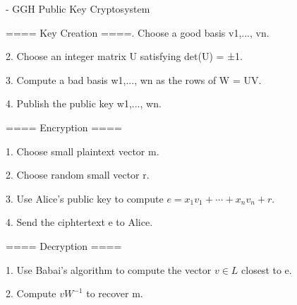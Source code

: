 \documentclass{article}
\begin{document}
- GGH Public Key Cryptosystem\newline
	
==== Key Creation ====\newline{}. Choose a good basis v1,..., vn.\par
2. Choose an integer matrix U satisfying det(U) = ±1.\par
3. Compute a bad basis w1,..., wn as the rows of W = UV.\par 
4. Publish the public key w1,..., wn.\par

\par
	==== Encryption ====\par 
1. Choose small plaintext vector m.\par
2. Choose random small vector r.\par 
3. Use Alice’s public key to compute $e = x_1v_1 + \text{···} + x_nv_n + r.$\par
4. Send the ciphtertext e to Alice.\par 
\par

	==== Decryption ====\par
1. Use Babai’s algorithm to compute the vector $v \in L$ closest to e.\par 
2. Compute $vW^{-1}$ to recover m.\par 
\end{document}
